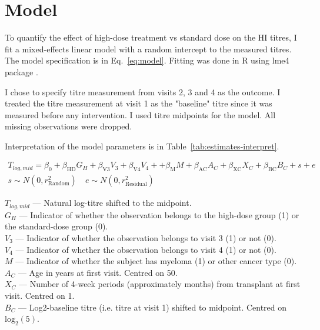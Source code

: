 \documentclass[11pt]{article}
\begin{document}
\section{Model}

To quantify the effect of high-dose treatment vs standard dose on the
HI titres, I fit a mixed-effects linear model with a random intercept
to the measured titres.
The model specification is in Eq.~\ref{eq:model}.
Fitting was done in R \cite{R} using lme4 package \cite{lme4}.

I chose to specify titre measurement from visits 2, 3 and 4 as the outcome.
I treated the titre measurement at visit 1 as the "baseline" titre since
it was measured before any intervention. I used titre midpoints for the model.
All missing observations were dropped.

Interpretation of the model parameters is in
Table~\ref{tab:estimates-interpret}.

\begin{equation}
    \begin{gathered}
        \label{eq:model}
        T_{log,mid} = \beta_0 + \beta_{\text{HD}}G_H + \beta_{\text{V3}}V_3
        + \beta_{\text{V4}}V_4 + + \beta_{\text{M}}M + \beta_{\text{AC}}A_C
        + \beta_{\text{XC}}X_C + \beta_{\text{BC}}B_C
        + s + e\\
        s \sim N(0, r^2_{\text{Random}}) \quad e \sim N(0, r^2_{\text{Residual}})
    \end{gathered}
\end{equation}

$T_{log,mid}$ --- Natural log-titre shifted to the midpoint.\\
$G_H$ --- Indicator of whether the observation belongs to the
high-dose group (1) or the standard-dose group (0).\\
$V_3$ --- Indicator of whether the observation belongs to
visit 3 (1) or not (0).\\
$V_4$ --- Indicator of whether the observation belongs to
visit 4 (1) or not (0).\\
$M$ --- Indicator of whether the subject has myeloma (1)
or other cancer type (0).\\
$A_C$ --- Age in years at first visit. Centred on 50.\\
$X_C$ --- Number of 4-week periods (approximately months)
from transplant at first visit. Centred on 1.\\
$B_C$ --- Log2-baseline titre (i.e. titre at visit 1) shifted to midpoint.
Centred on $\text{log}_2(5)$.
\end{document}
